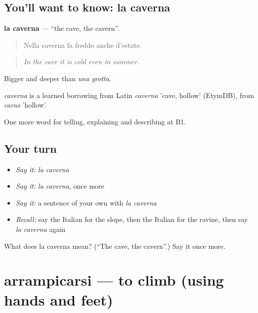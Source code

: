 \subsection*{You'll want to know: la caverna}
\textbf{la caverna} — \textquotedblleft{}the cave, the cavern\textquotedblright{}.

\begin{quote}
Nella caverna fa freddo anche d'estate.
\end{quote}

\begin{quote}
\emph{In the cave it is cold even in summer.}
\end{quote}

Bigger and deeper than \emph{una grotta}.

\begin{cousinweb}
\emph{caverna} is a learned borrowing from Latin \emph{caverna} 'cave, hollow' (EtymDB), from \emph{cavus} 'hollow'.
\end{cousinweb}

\begin{grammarlens}[title={What you've built}]
One more word for telling, explaining and describing at B1.
\end{grammarlens}

\subsection*{Your turn}
\begin{itemize}
\raggedright
  \item \emph{Say it:} \emph{la caverna}
  \item \emph{Say it:} \emph{la caverna}, once more
  \item \emph{Say it:} a sentence of your own with \emph{la caverna}
  \item \emph{Recall:} say the Italian for the slope, then the Italian for the ravine, then say \emph{la caverna} again
\end{itemize}

\begin{tcolorbox}[breakable,colback=teal!4,colframe=teal!35!black,title={Before you move on}]
What does la caverna mean? (\textquotedblleft{}The cave, the cavern\textquotedblright{}.) Say it once more.
\end{tcolorbox}
\section[arrampicarsi]{arrampicarsi — to climb (using hands and feet)}

